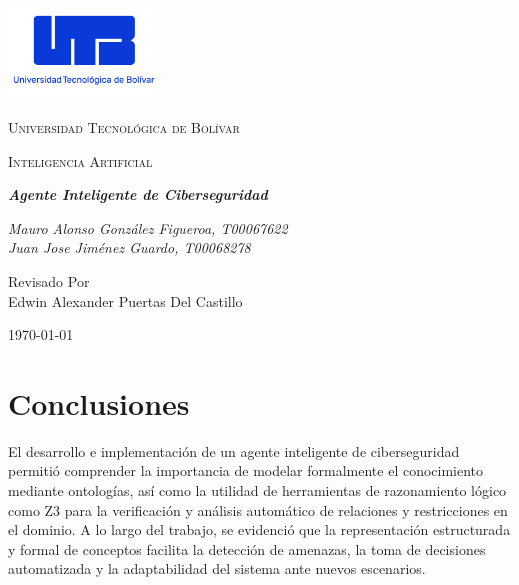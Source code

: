 \documentclass[letterpaper, 12pt]{article}
\begin{document}
\begin{titlepage}
    \centering
    \includegraphics[width=0.3\textwidth]{../../../images/logo_utb.png}
    \par\vspace{.5cm}

    {\scshape\LARGE Universidad Tecnológica de Bolívar \par}
    \vspace{1cm}

    {\scshape\Large Inteligencia Artificial \par}
    \vspace{1.5cm}

    \slshape {\Large \bfseries{}Agente Inteligente de Ciberseguridad\\}
    \vspace{2.5cm}

    \slshape {\itshape{} Mauro Alonso González Figueroa, T00067622 \\}
    \slshape {\itshape{} Juan Jose Jiménez Guardo, T00068278 \\}

    \vfill
    Revisado Por \\
    Edwin Alexander Puertas Del Castillo\\
    {\large \today\par}
\end{titlepage}

\tableofcontents{}
\newpage






\section*{Conclusiones}
El desarrollo e implementación de un agente inteligente de ciberseguridad permitió comprender la importancia de modelar formalmente el conocimiento mediante ontologías, así como la utilidad de herramientas de razonamiento lógico como Z3 para la verificación y análisis automático de relaciones y restricciones en el dominio.
A lo largo del trabajo, se evidenció que la representación estructurada y formal de conceptos facilita la detección de amenazas, la toma de decisiones automatizada y la adaptabilidad del sistema ante nuevos escenarios.
\end{document}
